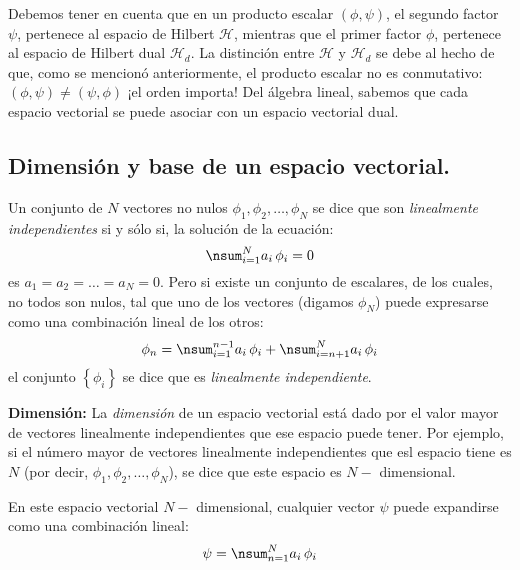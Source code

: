 Debemos tener en cuenta que en un producto escalar $(\phi, \psi)$, el segundo factor $\psi$, pertenece al espacio de Hilbert $\mathcal{H}$, mientras que el primer factor $\phi$, pertenece al espacio de Hilbert dual $\mathcal{H}_{d}$. La distinción entre $\mathcal{H}$ y $\mathcal{H}_{d}$ se debe al hecho de que, como se mencionó anteriormente, el producto escalar no es conmutativo: $(\phi, \psi) \neq (\psi, \phi)$ ¡el orden importa! Del álgebra lineal, sabemos que cada espacio vectorial se puede asociar con un espacio vectorial dual.

\subsection{Dimensión y base de un espacio vectorial.}

Un conjunto de $N$ vectores no nulos $\phi_{1}, \phi_{2}, \ldots, \phi_{N}$ se dice que son \emph{linealmente independientes} si y sólo si, la solución de la ecuación:
\begin{equation}
\nsum_{i=1}^{N} a_{i} \, \phi_{i} = 0
\label{eq:ecuacion_02_11}
\end{equation}
es $a_{1} = a_{2} = \ldots = a_{N} = 0$. Pero si existe un conjunto de escalares, de los cuales, no todos son nulos, tal que uno de los vectores (digamos $\phi_{N}$) puede expresarse como una combinación lineal de los otros:
\begin{equation}
\phi_{n} = \nsum_{i=1}^{n-1} a_{i} \, \phi_{i} + \nsum_{i=n+1}^{N} a_{i} \, \phi_{i}
\label{eq:ecuacion_02_12} 
\end{equation} 
el conjunto $\left\{ \phi_{i} \right\}$ se dice que es \emph{linealmente independiente}.

\textbf{Dimensión: } La \emph{dimensión} de un espacio vectorial está dado por el valor mayor de vectores linealmente independientes que ese espacio puede tener. Por ejemplo, si el número mayor de vectores linealmente independientes que esl espacio tiene es $N$ (por decir, $\phi_{1}, \phi_{2}, \ldots, \phi_{N}$), se dice que este espacio es $N-$ dimensional.
\par
En este espacio vectorial $N-$ dimensional, cualquier vector $\psi$ puede expandirse como una combinación lineal:
\begin{equation}
\psi = \nsum_{n=1}^{N} a_{i} \, \phi_{i}
\label{eq:ecuacion_02_13}
\end{equation}

